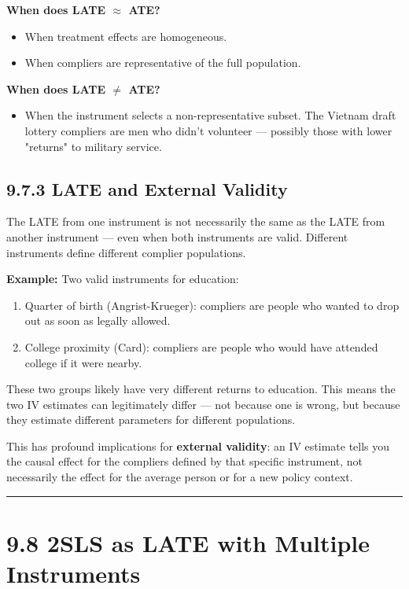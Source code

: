 \textbf{When does LATE $\approx$ ATE?}
\begin{itemize}
\item When treatment effects are homogeneous.
\item When compliers are representative of the full population.
\end{itemize}

\textbf{When does LATE $\neq$ ATE?}
\begin{itemize}
\item When the instrument selects a non-representative subset. The Vietnam draft lottery compliers are men who didn't volunteer --- possibly those with lower "returns" to military service.
\end{itemize}

\subsection{9.7.3 LATE and External Validity}

The LATE from one instrument is not necessarily the same as the LATE from another instrument --- even when both instruments are valid. Different instruments define different complier populations.

\textbf{Example:} Two valid instruments for education:
\begin{enumerate}
\item Quarter of birth (Angrist-Krueger): compliers are people who wanted to drop out as soon as legally allowed.
\item College proximity (Card): compliers are people who would have attended college if it were nearby.
\end{enumerate}

These two groups likely have very different returns to education. This means the two IV estimates can legitimately differ --- not because one is wrong, but because they estimate different parameters for different populations.

This has profound implications for \textbf{external validity}: an IV estimate tells you the causal effect for the compliers defined by that specific instrument, not necessarily the effect for the average person or for a new policy context.

\medskip\hrule\medskip

\section{9.8 2SLS as LATE with Multiple Instruments}

